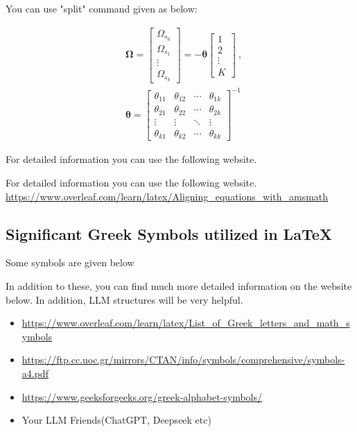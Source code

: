 You can use "split" command given as below:

\begin{equation}
\begin{split}
&\boldsymbol{\Omega}=\begin{bmatrix}
	\Omega_{s_0}\\
	\Omega_{s_1}\\
	\vdots\\
	\Omega_{s_k}
	\end{bmatrix} =-\mathbf{\theta}\begin{bmatrix}
	1\\
	2\\
	\vdots\\
	K
	\end{bmatrix} \ , \\
    &
    	\mathbf{\theta}=\begin{bmatrix}
	\theta_{11} & \theta_{12} & \cdots &\theta_{1k} \\
	\theta_{21} & \theta_{22} & \cdots &\theta_{2k} \\
	\vdots & \vdots & \ddots & \vdots \\
    \theta_{k1} & \theta_{k2} & \cdots &\theta_{kk}
	\end{bmatrix}^{-1}
\end{split}        
	\label{eq:10}
\end{equation}

%
%
For detailed information you can use the following website.

\medskip
For detailed information you can use the following website.\\
\url{https://www.overleaf.com/learn/latex/Aligning_equations_with_amsmath}


\subsection{Significant Greek Symbols utilized in \LaTeX}

Some symbols are given below



In addition to these, you can find much more detailed information on the website below. In addition, LLM structures will be very helpful.

\begin{itemize}
\item \url{https://www.overleaf.com/learn/latex/List_of_Greek_letters_and_math_symbols}
\item \url{https://ftp.cc.uoc.gr/mirrors/CTAN/info/symbols/comprehensive/symbols-a4.pdf}
\item \url{https://www.geeksforgeeks.org/greek-alphabet-symbols/}

\item Your LLM Friends(ChatGPT, Deepseek etc) 
\end{itemize}


